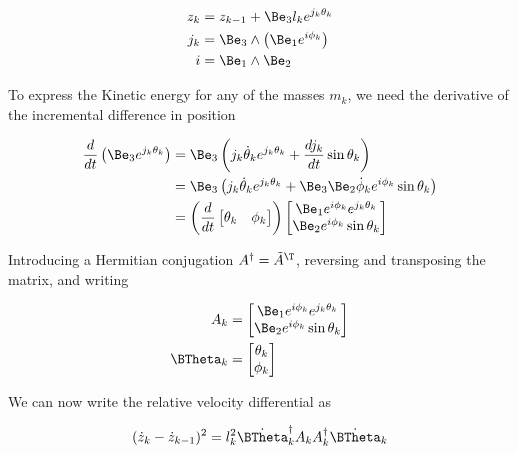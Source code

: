 \begin{align}\label{eqn:multiPendulumSpherical2:boo1}
z_k &= z_{k-1} + \Be_3 l_k e^{j_k \theta_k} \\
j_k &= \Be_3 \wedge \left( \Be_1 e^{i \phi_k} \right) \\
i &= \Be_1 \wedge \Be_2
\end{align}

To express the Kinetic energy for any of the masses $m_k$, we need the derivative of the incremental difference in position

\begin{align*}
\frac{d}{dt} \left( \Be_3 e^{j_k \theta_k} \right)
&=
\Be_3 \left( j_k \dot{\theta}_k e^{j_k \theta_k} + \frac{d j_k }{dt} \sin\theta_k \right)  \\
&=
\Be_3 \left( j_k \dot{\theta}_k e^{j_k \theta_k} + \Be_3 \Be_2 \dot{\phi}_k e^{i \phi_k} \sin\theta_k \right)  \\
&=
\left( \frac{d}{dt}
\begin{bmatrix}
\theta_k & \phi_k
\end{bmatrix} \right)
\begin{bmatrix}
\Be_1 e^{i \phi_k} e^{j_k \theta_k} \\
\Be_2 e^{i \phi_k} \sin\theta_k
\end{bmatrix}
\end{align*}

Introducing a Hermitian conjugation $A^\dagger = \tilde{A}^\T$, reversing and transposing the matrix, and writing

\begin{align}\label{eqn:multiPendulumSpherical2:boo2}
A_k &=
\begin{bmatrix}
\Be_1 e^{i \phi_k} e^{j_k \theta_k} \\
\Be_2 e^{i \phi_k} \sin\theta_k
\end{bmatrix} \\
\BTheta_k &=
\begin{bmatrix}
\theta_k \\
\phi_k
\end{bmatrix}
\end{align}

We can now write the relative velocity differential as

\begin{align}\label{eqn:multiPendulumSpherical2:boo3}
(\dot{z}_k - \dot{z}_{k-1})^2 = l_k^2 {\dot{\BTheta}_k}^\dagger A_k A_k^\dagger \dot{\BTheta}_k
\end{align}

